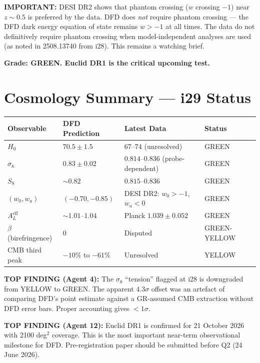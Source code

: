 \documentclass[11pt,a4paper]{article}
\begin{document}
\textbf{IMPORTANT:} DESI DR2 shows that phantom crossing ($w$ crossing $-1$) near $z \sim 0.5$ is preferred by the data. DFD does \emph{not} require phantom crossing --- the DFD dark energy equation of state remains $w > -1$ at all times. The data do not definitively require phantom crossing when model-independent analyses are used (as noted in 2508.13740 from i28). This remains a watching brief.

\textbf{Grade: GREEN. Euclid DR1 is the critical upcoming test.}

\section{Cosmology Summary --- i29 Status}

\begin{center}
\begin{tabular}{llll}
\toprule
\textbf{Observable} & \textbf{DFD Prediction} & \textbf{Latest Data} & \textbf{Status} \\
\midrule
$H_0$ & $70.5 \pm 1.5$ & $67$--$74$ (unresolved) & GREEN \\
$\sigma_8$ & $0.83 \pm 0.02$ & $0.814$--$0.836$ (probe-dependent) & GREEN \\
$S_8$ & $\sim 0.82$ & $0.815$--$0.836$ & GREEN \\
$(w_0, w_a)$ & $(-0.70, -0.85)$ & DESI DR2: $w_0 > -1$, $w_a < 0$ & GREEN \\
$A_L^\mathrm{eff}$ & $\sim 1.01$--$1.04$ & Planck $1.039 \pm 0.052$ & GREEN \\
$\beta$ (birefringence) & $0$ & Disputed & GREEN-YELLOW \\
CMB third peak & $-10\%$ to $-61\%$ & Unresolved & YELLOW \\
\bottomrule
\end{tabular}
\end{center}

\textbf{TOP FINDING (Agent 4):} The $\sigma_8$ ``tension'' flagged at i28 is downgraded from YELLOW to GREEN. The apparent $4.3\sigma$ offset was an artefact of comparing DFD's point estimate against a GR-assumed CMB extraction without DFD error bars. Proper accounting gives $<1\sigma$.

\textbf{TOP FINDING (Agent 12):} Euclid DR1 is confirmed for 21 October 2026 with 2100 deg$^2$ coverage. This is the most important near-term observational milestone for DFD. Pre-registration paper should be submitted before Q2 (24 June 2026).
\end{document}

